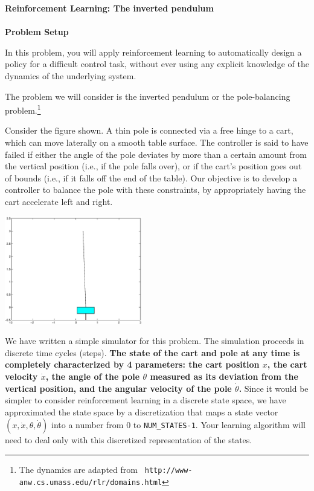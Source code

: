 
\item {} {\bf Reinforcement Learning: The inverted pendulum}
\\\\
{\bf Problem Setup}

In this problem, you will apply reinforcement learning to automatically
design a policy for a difficult control task, without ever using any 
explicit knowledge of the dynamics of the underlying system.

The problem we will consider is the inverted pendulum or the pole-balancing 
problem.\footnote{The dynamics are adapted from {\tt
    http://www-anw.cs.umass.edu/rlr/domains.html}}

Consider the figure shown. A thin pole is connected via a free hinge to a cart, 
which can move laterally on a smooth table surface. The controller is said to 
have failed if either the angle of the pole deviates by more than a certain
amount from the vertical position (i.e., if the pole falls over), or if the
cart's position goes out of bounds (i.e., if it falls off the end of the table).
Our objective is to develop a controller to balance the pole with these 
constraints, by appropriately having the cart accelerate left and right.


\begin{center}
  \includegraphics[width=6cm]{cartpole/cart_pole.eps}
\end{center}

We have written a simple simulator for this problem. The simulation 
proceeds in discrete time cycles (steps). \textbf{The state of the cart and pole at any time 
is completely characterized by 4 parameters: the cart position $x$, the 
cart velocity $\dot{x}$, the angle of the pole $\theta$ measured as its deviation 
from the vertical position, and the angular velocity of the pole $\dot{\theta}$.  }
Since it would be simpler to
consider reinforcement learning in a discrete state space,
we have approximated the state space by a discretization that maps 
a state vector $(x,\dot{x}, \theta, \dot{\theta})$ into a number
from 0 to {\tt NUM\_STATES-1}. Your learning algorithm will need to 
deal only with this discretized representation of the states.

